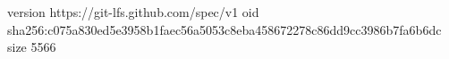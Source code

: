 version https://git-lfs.github.com/spec/v1
oid sha256:c075a830ed5e3958b1faec56a5053c8eba458672278c86dd9cc3986b7fa6b6dc
size 5566
